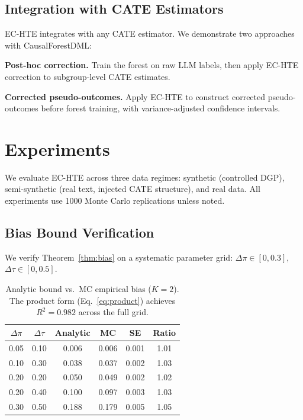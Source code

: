 \documentclass[11pt,a4paper]{article}
\begin{document}
\subsection{Integration with CATE Estimators}

EC-HTE integrates with any CATE estimator. We demonstrate two approaches with CausalForestDML:

\textbf{Post-hoc correction.} Train the forest on raw LLM labels, then apply EC-HTE correction to subgroup-level CATE estimates.

\textbf{Corrected pseudo-outcomes.} Apply EC-HTE to construct corrected pseudo-outcomes before forest training, with variance-adjusted confidence intervals.

\section{Experiments}
\label{sec:experiments}

We evaluate EC-HTE across three data regimes: synthetic (controlled DGP), semi-synthetic (real text, injected CATE structure), and real data. All experiments use 1000 Monte Carlo replications unless noted.

\subsection{Bias Bound Verification}
\label{sec:bound}

We verify Theorem~\ref{thm:bias} on a systematic parameter grid: $\Delta\pi \in [0, 0.3]$, $\Delta\tau \in [0, 0.5]$.

\begin{table}[t]
\centering
\small
\begin{tabular}{cccccc}
\toprule
$\Delta\pi$ & $\Delta\tau$ & Analytic & MC & SE & Ratio \\
\midrule
0.05 & 0.10 & 0.006 & 0.006 & 0.001 & 1.01 \\
0.10 & 0.30 & 0.038 & 0.037 & 0.002 & 1.03 \\
0.20 & 0.20 & 0.050 & 0.049 & 0.002 & 1.02 \\
0.20 & 0.40 & 0.100 & 0.097 & 0.003 & 1.03 \\
0.30 & 0.50 & 0.188 & 0.179 & 0.005 & 1.05 \\
\bottomrule
\end{tabular}
\caption{Analytic bound vs.\ MC empirical bias ($K=2$). The product form (Eq.~\ref{eq:product}) achieves $R^2 = 0.982$ across the full grid.}
\label{tab:bound}
\end{table}
\end{document}
